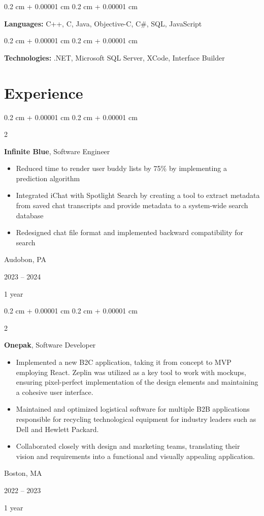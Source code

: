 \documentclass[10pt, letterpaper]{article}
\newenvironment{highlights}{
    \begin{itemize}[
        topsep=0.10 cm,
        parsep=0.10 cm,
        partopsep=0pt,
        itemsep=0pt,
        leftmargin=0.4 cm + 10pt
    ]
}{
    \end{itemize}
} %
\newenvironment{onecolentry}{
    \begin{adjustwidth}{
        0.2 cm + 0.00001 cm
    }{
        0.2 cm + 0.00001 cm
    }
}{
    \end{adjustwidth}
} %
\newenvironment{twocolentry}[2][]{
    \onecolentry
    \def\secondColumn{#2}
    \setcolumnwidth{\fill, 4.5 cm}
    \begin{paracol}{2}
}{
    \switchcolumn \raggedleft \secondColumn
    \end{paracol}
    \endonecolentry
} %
\begin{document}
        
        \begin{onecolentry}
            \textbf{Languages:} C++, C, Java, Objective-C, C\#, SQL, JavaScript
        \end{onecolentry}

        \vspace{0.2 cm}

        \begin{onecolentry}
            \textbf{Technologies:} .NET, Microsoft SQL Server, XCode, Interface Builder
        \end{onecolentry}


    
    \section{Experience}



        
        \begin{twocolentry}{
            Audobon, PA

        2023 – 2024

        1 year
        }
            \textbf{Infinite Blue}, Software Engineer
            \begin{highlights}
                \item Reduced time to render user buddy lists by 75\% by implementing a prediction algorithm
                \item Integrated iChat with Spotlight Search by creating a tool to extract metadata from saved chat transcripts and provide metadata to a system-wide search database
                \item Redesigned chat file format and implemented backward compatibility for search
            \end{highlights}
        \end{twocolentry}


        \vspace{0.2 cm}

        \begin{twocolentry}{
            Boston, MA

        2022 – 2023

        1 year
        }
            \textbf{Onepak}, Software Developer
            \begin{highlights}
                \item Implemented a new B2C application, taking it from concept to MVP employing React. Zeplin was utilized  as a key tool to work with mockups, ensuring pixel-perfect implementation of the design elements and maintaining a cohesive user interface.
                \item Maintained and optimized logistical software for multiple B2B applications responsible for recycling technological equipment for industry leaders such as Dell and Hewlett Packard.
                \item Collaborated closely with design and marketing teams, translating their vision and requirements into a functional and visually appealing application.
            \end{highlights}
        \end{twocolentry}
\end{document}

